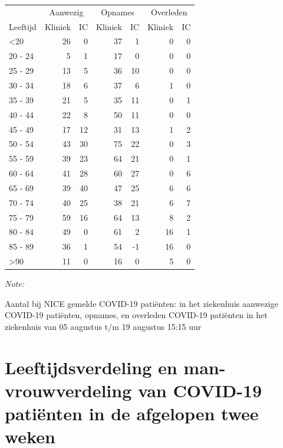 \documentclass[
  english,
  man,floatsintext]{apa6}
\begin{document}
\begin{table}
\centering\begingroup\fontsize{10}{12}\selectfont

\begin{threeparttable}
\begin{tabular}{lrrrrrr}
\toprule
\multicolumn{1}{c}{ } & \multicolumn{2}{c}{Aanwezig} & \multicolumn{2}{c}{Opnames} & \multicolumn{2}{c}{Overleden} \\
\cmidrule(l{3pt}r{3pt}){2-3} \cmidrule(l{3pt}r{3pt}){4-5} \cmidrule(l{3pt}r{3pt}){6-7}
Leeftijd & Kliniek & IC & Kliniek & IC & Kliniek & IC\\
\midrule
<20 & 26 & 0 & 37 & 1 & 0 & 0\\
20 - 24 & 5 & 1 & 17 & 0 & 0 & 0\\
25 - 29 & 13 & 5 & 36 & 10 & 0 & 0\\
30 - 34 & 18 & 6 & 37 & 6 & 1 & 0\\
35 - 39 & 21 & 5 & 35 & 11 & 0 & 1\\
40 - 44 & 22 & 8 & 50 & 11 & 0 & 0\\
45 - 49 & 17 & 12 & 31 & 13 & 1 & 2\\
50 - 54 & 43 & 30 & 75 & 22 & 0 & 3\\
55 - 59 & 39 & 23 & 64 & 21 & 0 & 1\\
60 - 64 & 41 & 28 & 60 & 27 & 0 & 6\\
65 - 69 & 39 & 40 & 47 & 25 & 6 & 6\\
70 - 74 & 40 & 25 & 38 & 21 & 6 & 7\\
75 - 79 & 59 & 16 & 64 & 13 & 8 & 2\\
80 - 84 & 49 & 0 & 61 & 2 & 16 & 1\\
85 - 89 & 36 & 1 & 54 & -1 & 16 & 0\\
>90 & 11 & 0 & 16 & 0 & 5 & 0\\
\bottomrule
\end{tabular}
\begin{tablenotes}
\item \textit{Note: } 
\item Aantal bij NICE gemelde COVID-19 patiënten: in het ziekenhuis aanwezige COVID-19 patiënten, opnames, en overleden COVID-19 patiënten in het ziekenhuis van 05 augustus t/m 19 augustus 15:15 uur
\end{tablenotes}
\end{threeparttable}
\endgroup{}
\end{table}

\newpage

\hypertarget{leeftijdsverdeling-en-man-vrouwverdeling-van-covid-19-patiuxebnten-in-de-afgelopen-twee-weken}{%
\section{Leeftijdsverdeling en man-vrouwverdeling van COVID-19 patiënten in de afgelopen twee weken}\label{leeftijdsverdeling-en-man-vrouwverdeling-van-covid-19-patiuxebnten-in-de-afgelopen-twee-weken}}
\end{document}
